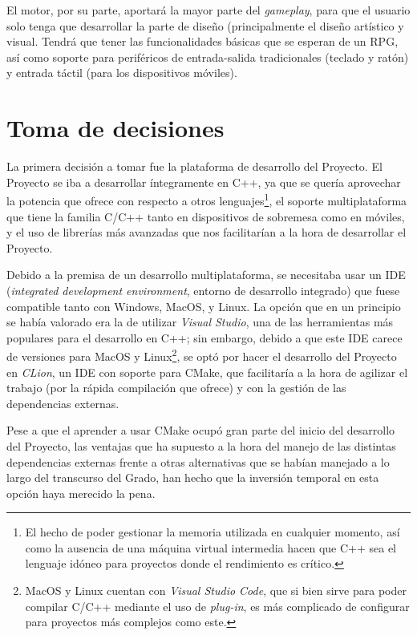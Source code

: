 \medskip

El motor, por su parte, aportará la mayor parte del \textit{gameplay}, para que el usuario solo tenga que desarrollar la parte de diseño (principalmente el diseño artístico y visual. Tendrá que tener las funcionalidades básicas que se esperan de un RPG, así como soporte para periféricos de entrada-salida tradicionales (teclado y ratón) y entrada táctil (para los dispositivos móviles). 

\section{Toma de decisiones}
\label{sec:decisiones}
La primera decisión a tomar fue la plataforma de desarrollo del Proyecto. El Proyecto se iba a desarrollar íntegramente en C++, ya que se quería aprovechar la potencia que ofrece con respecto a otros lenguajes\footnote{El hecho de poder gestionar la memoria utilizada en cualquier momento, así como la ausencia de una máquina virtual intermedia hacen que C++ sea el lenguaje idóneo para proyectos donde el rendimiento es crítico.}, el soporte multiplataforma que tiene la familia C/C++ tanto en dispositivos de sobremesa como en móviles, y el uso de librerías más avanzadas que nos facilitarían a la hora de desarrollar el Proyecto.

\medskip

Debido a la premisa de un desarrollo multiplataforma, se necesitaba usar un IDE (\textit{integrated development environment}, entorno de desarrollo integrado) que fuese compatible tanto con Windows, MacOS, y Linux. La opción que en un principio se había valorado era la de utilizar \textit{Visual Studio}, una de las herramientas más populares para el desarrollo en C++; sin embargo, debido a que este IDE carece de versiones para MacOS y Linux\footnote{MacOS y Linux cuentan con \textit{Visual Studio Code}, que si bien sirve para poder compilar C/C++ mediante el uso de \textit{plug-in}, es más complicado de configurar para proyectos más complejos como este.}, se optó por hacer el desarrollo del Proyecto en \textit{CLion}, un IDE con soporte para CMake, que facilitaría a la hora de agilizar el trabajo (por la rápida compilación que ofrece) y con la gestión de las dependencias externas.

\smallskip

Pese a que el aprender a usar CMake ocupó gran parte del inicio del desarrollo del Proyecto, las ventajas que ha supuesto a la hora del manejo de las distintas dependencias externas frente a otras alternativas que se habían manejado a lo largo del transcurso del Grado, han hecho que la inversión temporal en esta opción haya merecido la pena.

